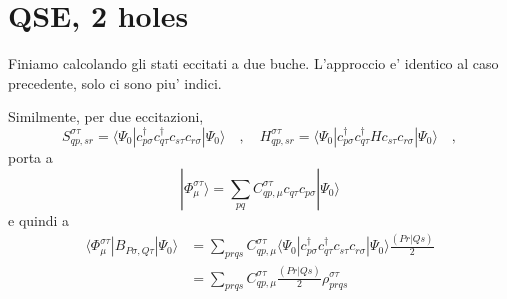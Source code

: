 \documentclass{report}
\begin{document}
\section{QSE, 2 holes}

{\color{red}
Finiamo calcolando gli stati eccitati a due buche. L'approccio e' identico al caso precedente, solo ci sono piu' indici.
}


\noindent
Similmente, per due eccitazioni,
\begin{equation}
S^{\sigma\tau}_{qp,sr} = \langle \Psi_0 | c^\dagger_{p\sigma} c^\dagger_{q\tau} c_{s\tau} c_{r\sigma} | \Psi_0 \rangle
\quad,\quad
H^{\sigma\tau}_{qp,sr} = \langle \Psi_0 | c^\dagger_{p\sigma} c^\dagger_{q\tau} H c_{s\tau} c_{r\sigma} | \Psi_0 \rangle
\quad,
\end{equation}
porta a
\begin{equation}
| \Phi_{\mu}^{\sigma\tau} \rangle = \sum_{pq} C^{\sigma\tau}_{qp,\mu} c_{q\tau} c_{p\sigma} | \Psi_0 \rangle 
\end{equation}
e quindi a
\begin{equation}
\begin{split}
\langle \Phi_{\mu}^{\sigma\tau} | B_{P\sigma,Q\tau} | \Psi_0 \rangle 
&=
\sum_{prqs} C^{\sigma\tau}_{qp,\mu} \langle \Psi_0 | c^\dagger_{p\sigma} c^\dagger_{q\tau} c_{s\tau} c_{r\sigma} | \Psi_0 \rangle \frac{(Pr|Qs)}{2}  \\
&= \sum_{prqs} C^{\sigma\tau}_{qp,\mu} \frac{(Pr|Qs)}{2} \rho^{\sigma\tau}_{prqs}
\end{split}
\end{equation}
\end{document}
